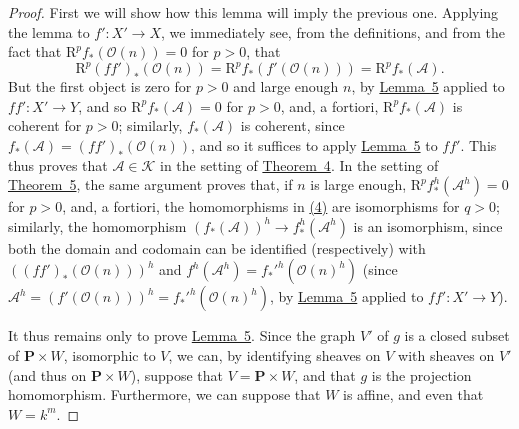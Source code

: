 \documentclass{article}
\newcommand{\scr}[1]{{\mathscr{#1}}}
\renewcommand{\cal}[1]{{\mathcal{#1}}}
\newcommand{\RR}{\mathrm{R}}
\newcommand{\oldpage}[1]{\marginpar{\footnotesize$\Big\vert$ \textit{p.~#1}}}
\begin{document}
\begin{proof}
  First we will show how this lemma will imply the previous one.
  Applying the lemma to $f'\colon X'\to X$, we immediately see, from the definitions, and from the fact that $\RR^pf_*(\scr{O}(n))=0$ for $p>0$, that
  \[
    \RR^p(ff')_*(\scr{O}(n)) = \RR^pf_*(f'(\scr{O}(n))) = \RR^pf_*(\scr{A}).
  \]
\oldpage{2-12}
  But the first object is zero for $p>0$ and large enough $n$, by \hyperref[lemma5]{Lemma~5} applied to $ff'\colon X'\to Y$, and so $\RR^pf_*(\scr{A})=0$ for $p>0$, and, a fortiori, $\RR^pf_*(\scr{A})$ is coherent for $p>0$;
  similarly, $f_*(\scr{A})$ is coherent, since $f_*(\scr{A})=(ff')_*(\scr{O}(n))$, and so it suffices to apply \hyperref[lemma5]{Lemma~5} to $ff'$.
  This thus proves that $\scr{A}\in\cal{K}$ in the setting of \hyperref[theorem4]{Theorem~4}.
  In the setting of \hyperref[theorem5]{Theorem~5}, the same argument proves that, if $n$ is large enough, $\RR^pf_*^h(\scr{A}^h)=0$ for $p>0$, and, a fortiori, the homomorphisms in \hyperref[equation4]{(4)} are isomorphisms for $q>0$;
  similarly, the homomorphism $(f_*(\scr{A}))^h\to f_*^h(\scr{A}^h)$ is an isomorphism, since both the domain and codomain can be identified (respectively) with $((ff')_*(\scr{O}(n)))^h$ and $f^h(\scr{A}^h)=f_*'^h(\scr{O}(n)^h)$ (since $\scr{A}^h=(f'(\scr{O}(n)))^h=f_*'^h(\scr{O}(n)^h)$, by \hyperref[lemma5]{Lemma~5} applied to $ff'\colon X'\to Y$).

  It thus remains only to prove \hyperref[lemma5]{Lemma~5}.
  Since the graph $V'$ of $g$ is a closed subset of $\mathbf{P}\times W$, isomorphic to $V$, we can, by identifying sheaves on $V$ with sheaves on $V'$ (and thus on $\mathbf{P}\times W$), suppose that $V=\mathbf{P}\times W$, and that $g$ is the projection homomorphism.
  Furthermore, we can suppose that $W$ is affine, and even that $W=k^m$.


\end{proof}
\end{document}
